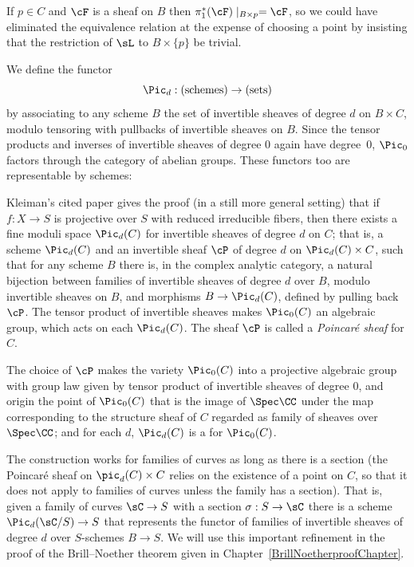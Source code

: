 If $p \in C$ and $\cF$ is a sheaf on $B$ then $\pi_1^*(\cF)\mid_{B\times p} = \cF$, so we could have eliminated the
equivalence relation at the expense of choosing a point by insisting that the restriction of $\sL$ to $B \times \{p\}$ be trivial.

We define the functor
%
 $$
 \Pic_d : (\textrm{schemes}) \to (\textrm{sets})
 $$
by associating to any scheme $B$ the set of invertible sheaves of
degree $d$ on $B \times C$, modulo tensoring with pullbacks of
invertible sheaves on $B$. Since the tensor products and inverses of
invertible sheaves of degree 0 again
have
degree~0,
$\Pic_0$ factors through the category of abelian groups. These
functors too are representable by schemes:

\begin{fact}
\label{picard existence1}
Kleiman's cited paper gives the proof (in a still more general setting) that if
$f:X\to S$ is projective over $S$ with reduced irreducible fibers, then
there exists a fine moduli space $\Pic_d(C)$ for invertible sheaves of
degree $d$ on $C$; that is, a scheme $\Pic_d(C)$ and an invertible
sheaf $\cP$ of degree $d$ on $\Pic_d(C) \times C$, such that for any
scheme $B$ there is, in the complex analytic category, a natural bijection between families of invertible
sheaves of degree $d$ over $B$, modulo invertible sheaves on $B$, and
morphisms $B \to \Pic_d(C)$, defined by pulling back $\cP$. The tensor
product of invertible sheaves makes $\Pic_0(C)$ an algebraic group,
which acts on each $\Pic_d(C)$. The sheaf $\cP$ is called a
%
\emph{Poincar\'e sheaf} for $C$.

The choice of $\cP$ makes the variety $\Pic_0(C)$ into a
projective algebraic group
%
%
with group law given by tensor product of
invertible sheaves of degree 0, and origin the point of $\Pic_0(C)$
that is the
 image of $\Spec \CC$ under the map corresponding to the structure sheaf of $C$ regarded
 as family of sheaves over $\Spec \CC$; and for each $d$, $\Pic_d(C)$
 is a
%
for $\Pic_0(C)$.

The construction works for families of curves as long as there is a section (the Poincar\'e sheaf on $\pic_d(C) \times C$ relies on the existence of a point on $C$, so that it does not apply to families of curves unless the family has a section). That is, given a family of curves $\sC \to S$ with a section $\sigma: S\to \sC$
 there is a scheme $\Pic_{d}(\sC/S) \to S$ that represents the functor of families of invertible sheaves of
 degree $d$ over $S$-schemes $B\to S$. We will use this important refinement in the proof of the Brill--Noether theorem given in Chapter~\ref{BrillNoetherproofChapter}.
  \end{fact}


